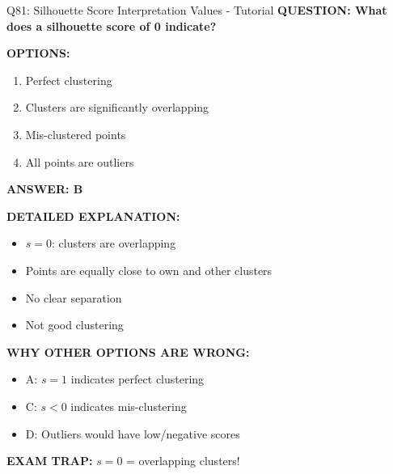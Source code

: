 \documentclass[8pt]{beamer}
\begin{document}
	\begin{frame}{Q81: Silhouette Score Interpretation Values - Tutorial}
		\fontsize{6.5}{7.5}\selectfont
		\textbf{QUESTION: What does a silhouette score of 0 indicate?}
		
		\vspace{0.1cm}
		\textbf{OPTIONS:}
		\begin{enumerate}
			\item Perfect clustering
			\item Clusters are significantly overlapping
			\item Mis-clustered points
			\item All points are outliers
		\end{enumerate}
		
		\vspace{0.1cm}
		\textcolor{myblue}{\textbf{ANSWER: B}}
		
		\vspace{0.1cm}
		\textbf{DETAILED EXPLANATION:}
		\begin{itemize}
			\item $s = 0$: clusters are overlapping
			\item Points are equally close to own and other clusters
			\item No clear separation
			\item Not good clustering
		\end{itemize}
		
		\vspace{0.1cm}
		\textcolor{myred}{\textbf{WHY OTHER OPTIONS ARE WRONG:}}
		\begin{itemize}
			\item \textcolor{myred}{A:} $s = 1$ indicates perfect clustering
			\item \textcolor{myred}{C:} $s < 0$ indicates mis-clustering
			\item \textcolor{myred}{D:} Outliers would have low/negative scores
		\end{itemize}
		
		\textcolor{myred}{\textbf{EXAM TRAP:}} $s = 0$ = \textcolor{myblue}{overlapping clusters}!
	\end{frame}
	
\end{document}
